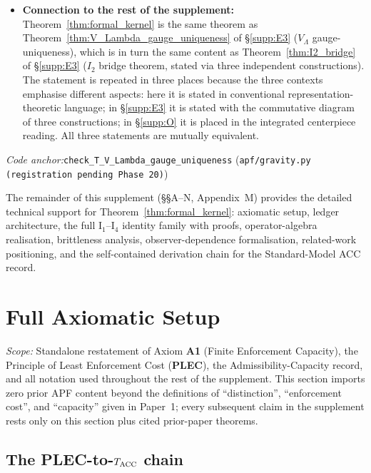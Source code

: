 \documentclass[11pt]{article}
\theoremstyle{plain}
\theoremstyle{definition}
\theoremstyle{remark}
\newcommand{\Aone}{\textbf{A1}}
\newcommand{\PLEC}{\textbf{PLEC}}
\newcommand{\coderef}[2]{\par\noindent\textit{Code anchor:}\quad\texttt{#1} (\texttt{#2})}
\begin{document}
\begin{itemize}[leftmargin=2em,itemsep=4pt]
  \item \textbf{Connection to the rest of the supplement:}  Theorem~\ref{thm:formal_kernel} is the same theorem as Theorem~\ref{thm:V_Lambda_gauge_uniqueness} of \S\ref{supp:E3} ($V_\Lambda$ gauge-uniqueness), which is in turn the same content as Theorem~\ref{thm:I2_bridge} of \S\ref{supp:E3} ($I_2$ bridge theorem, stated via three independent constructions).  The statement is repeated in three places because the three contexts emphasise different aspects: here it is stated in conventional representation-theoretic language; in \S\ref{supp:E3} it is stated with the commutative diagram of three constructions; in \S\ref{supp:O} it is placed in the integrated centerpiece reading.  All three statements are mutually equivalent.
\end{itemize}

\coderef{check\_T\_V\_Lambda\_gauge\_uniqueness}{apf/gravity.py (registration pending Phase 20)}

\bigskip

\noindent The remainder of this supplement (\S\S A--N, Appendix~M) provides the detailed technical support for Theorem~\ref{thm:formal_kernel}: axiomatic setup, ledger architecture, the full I$_1$--I$_4$ identity family with proofs, operator-algebra realisation, brittleness analysis, observer-dependence formalisation, related-work positioning, and the self-contained derivation chain for the Standard-Model ACC record.

\newpage

\section{Full Axiomatic Setup}\label{supp:A}

\noindent\textit{Scope:} Standalone restatement of Axiom \Aone{} (Finite Enforcement Capacity), the Principle of Least Enforcement Cost (\PLEC), the Admissibility-Capacity record, and all notation used throughout the rest of the supplement.  This section imports zero prior APF content beyond the definitions of ``distinction'', ``enforcement cost'', and ``capacity'' given in Paper~1; every subsequent claim in the supplement rests only on this section plus cited prior-paper theorems.

\bigskip

\subsection{The PLEC-to-\texorpdfstring{$T_{\rm ACC}$}{T\_ACC} chain}\label{supp:A_plec_chain}
\end{document}
